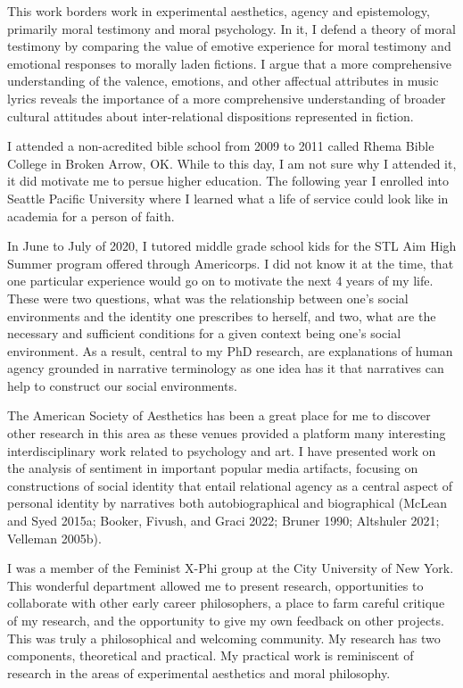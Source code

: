 \documentclass[phdthesis,12pt,final,a4paper]{wuthesis}
\theoremstyle{definition}
\theoremstyle{definition}
\theoremstyle{definition}
\theoremstyle{definition}
\theoremstyle{remark}
\begin{document}
\begin{thesisacknowledgments}
This work borders work in experimental aesthetics, agency and epistemology, primarily moral testimony and moral psychology. In it, I defend a theory of moral testimony by comparing the value of emotive experience for moral testimony and emotional responses to morally laden fictions. I argue that a more comprehensive understanding of the valence, emotions, and other affectual attributes in music lyrics reveals the importance of a more comprehensive understanding of broader cultural attitudes about inter-relational dispositions represented in fiction.

I attended a non-acredited bible school from 2009 to 2011 called Rhema Bible College in Broken Arrow, OK. While to this day, I am not sure why I attended it, it did motivate me to persue higher education. The following year I enrolled into Seattle Pacific University where I learned what a life of service could look like in academia for a person of faith.

In June to July of 2020, I tutored middle grade school kids for the STL Aim High Summer program offered through Americorps. I did not know it at the time, that one particular experience would go on to motivate the next 4 years of my life. These were two questions, what was the relationship between one's social environments and the identity one prescribes to herself, and two, what are the necessary and sufficient conditions for a given context being one's social environment. As a result, central to my PhD research, are explanations of human agency grounded in narrative terminology as one idea has it that narratives can help to construct our social environments.

The American Society of Aesthetics has been a great place for me to discover other research in this area as these venues provided a platform many interesting interdisciplinary work related to psychology and art. I have presented work on the analysis of sentiment in important popular media artifacts, focusing on constructions of social identity that entail relational agency as a central aspect of personal identity by narratives both autobiographical and biographical (McLean and Syed 2015a; Booker, Fivush, and Graci 2022; Bruner 1990; Altshuler 2021; Velleman 2005b).

I was a member of the Feminist X-Phi group at the City University of New York. This wonderful department allowed me to present research, opportunities to collaborate with other early career philosophers, a place to farm careful critique of my research, and the opportunity to give my own feedback on other projects. This was truly a philosophical and welcoming community. My research has two components, theoretical and practical. My practical work is reminiscent of research in the areas of experimental aesthetics and moral philosophy.


\end{thesisacknowledgments}
\end{document}
